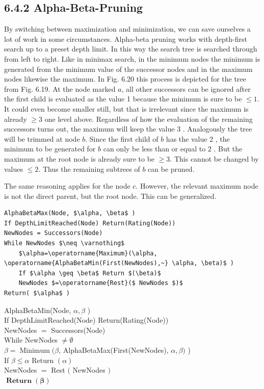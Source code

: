 \documentclass[10pt]{article}
\begin{document}
\subsection*{6.4.2 Alpha-Beta-Pruning}
By switching between maximization and minimization, we can save ourselves a lot of work in some circumstances. Alpha-beta pruning works with depth-first search up to a preset depth limit. In this way the search tree is searched through from left to right. Like in minimax search, in the minimum nodes the minimum is generated from the minimum value of the successor nodes and in the maximum nodes likewise the maximum. In Fig. 6.20 this process is depicted for the tree from Fig. 6.19. At the node marked $a$, all other successors can be ignored after the first child is evaluated as the value 1 because the minimum is sure to be $\leq 1$. It could even become smaller still, but that is irrelevant since the maximum is already $\geq 3$ one level above. Regardless of how the evaluation of the remaining successors turns out, the maximum will keep the value 3 . Analogously the tree will be trimmed at node $b$. Since the first child of $b$ has the value 2 , the minimum to be generated for $b$ can only be less than or equal to 2 . But the maximum at the root node is already sure to be $\geq 3$. This cannot be changed by values $\leq 2$. Thus the remaining subtrees of $b$ can be pruned.


The same reasoning applies for the node $c$. However, the relevant maximum node is not the direct parent, but the root node. This can be generalized.

\begin{verbatim}
AlphaBetaMax(Node, $\alpha, \beta$ )
If DepthLimitReached(Node) Return(Rating(Node))
NewNodes = Successors(Node)
While NewNodes $\neq \varnothing$
    $\alpha=\operatorname{Maximum}(\alpha, \operatorname{AlphaBetaMin(First(NewNodes),~} \alpha, \beta)$ )
    If $\alpha \geq \beta$ Return $(\beta)$
    NewNodes $=\operatorname{Rest}($ NewNodes $)$
Return( $\alpha$ )
\end{verbatim}

AlphaBetaMin(Node, $\alpha, \beta$ )\\
If DepthLimitReached(Node) Return(Rating(Node))\\
NewNodes $=$ Successors(Node)\\
While NewNodes $\neq \emptyset$\\
$\beta=\operatorname{Minimum}(\beta$, AlphaBetaMax(First(NewNodes), $\alpha, \beta)$ )\\
If $\beta \leq \alpha$ Return $(\alpha)$\\
NewNodes $=$ Rest $($ NewNodes $)$\\
$\boldsymbol{\operatorname { R e t u r n }}(\boldsymbol{\beta})$
\end{document}
